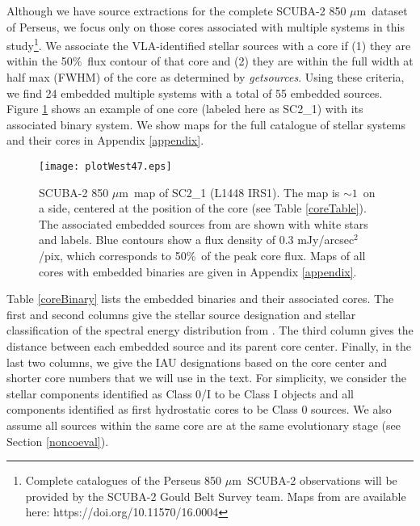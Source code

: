 \documentclass[usenatbib,a4paper]{mnras}
\newcommand{\mJyarcsec}{\mbox{mJy/arcsec$^{2}$/pix}}%
\newcommand{\um}{\mbox{$\mu$m}}%
\begin{document}
Although we have source extractions for the complete SCUBA-2 850 \um\ dataset of Perseus, we focus only on those cores associated with multiple systems in this study\footnote{Complete catalogues of the Perseus 850 \um\ SCUBA-2 observations will be provided by the SCUBA-2 Gould Belt Survey team.  Maps from \citet{MChen16} are available here: https://doi.org/10.11570/16.0004}.  We associate the VLA-identified stellar sources with a core if (1) they are within the 50\%\ flux contour of that core and (2) they are within the full width at half max (FWHM) of the core as determined by \emph{getsources}.  Using these criteria, we find 24 embedded multiple systems with a total of 55 embedded sources.  Figure \ref{example_map} shows an example of one core (labeled here as SC2\_1) with its associated binary system.  We show maps for the full catalogue of stellar systems and their cores in Appendix \ref{appendix}.


\begin{figure}
\texttt{[image: plotWest47.eps]}
\caption{SCUBA-2 850 \um\ map of SC2\_1 (L1448 IRS1).  The map is $\sim 1$\arcmin\ on a side, centered at the position of the core (see Table \ref{coreTable}).  The associated embedded sources from \citet{Tobin16} are shown with white stars and labels.  Blue contours show a flux density of 0.3 \mJyarcsec, which corresponds to 50\%\ of the peak core flux. Maps of all cores with embedded binaries are given in Appendix \ref{appendix}.\label{example_map}}
\end{figure}

Table \ref{coreBinary} lists the embedded binaries and their associated cores.  The first and second columns give the stellar source designation and stellar classification of the spectral energy distribution from \citet{Tobin16}.  The third column gives the distance between each embedded source and its parent core center.  Finally, in the last two columns, we give the IAU designations based on the core center and shorter core numbers that we will use in the text.    For simplicity, we consider the stellar components identified as Class 0/I to be Class I objects and all components identified as first hydrostatic cores \citep[e.g.,][]{Larson69, Pezzuto12} to be Class 0 sources.   We also assume all sources within the same core are at the same evolutionary stage (see Section \ref{noncoeval}).
\end{document}
